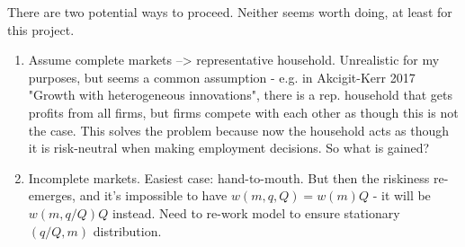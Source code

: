 \documentclass[11pt,english]{article}
\theoremstyle{remark}
\begin{document}
There are two potential ways to proceed. Neither seems worth doing, at least for this project.

\begin{enumerate}
	\item Assume complete markets --> representative household. Unrealistic for my purposes, but seems a common assumption - e.g. in Akcigit-Kerr 2017 "Growth with heterogeneous innovations", there is a rep. household that gets profits from all firms, but firms compete with each other as though this is not the case. This solves the problem because now the household acts as though it is risk-neutral when making employment decisions. So what is gained? 
	\item Incomplete markets. Easiest case: hand-to-mouth. But then the riskiness re-emerges, and it's impossible to have $w(m,q,Q) = w(m)Q$ - it will be $w(m,q/Q)Q$ instead. Need to re-work model to ensure stationary $(q/Q,m)$ distribution. 
\end{enumerate}
\end{document}
